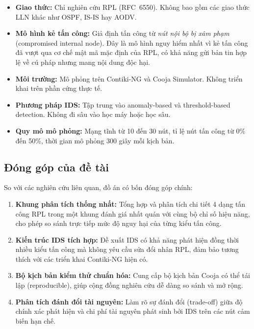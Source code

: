 \begin{itemize}
    \item \textbf{Giao thức:} Chỉ nghiên cứu RPL (RFC~6550). Không bao
          gồm các giao thức LLN khác như OSPF, IS-IS hay AODV.

    \item \textbf{Mô hình kẻ tấn công:} Giả định tấn công từ \textit{nút
          nội bộ bị xâm phạm} (compromised internal node). Đây là mô
          hình nguy hiểm nhất vì kẻ tấn công đã vượt qua cơ chế mật mã
          mặc định của RPL, có khả năng gửi bản tin hợp lệ về cú pháp
          nhưng mang nội dung độc hại.

    \item \textbf{Môi trường:} Mô phỏng trên Contiki-NG và Cooja
          Simulator. Không triển khai trên phần cứng thực tế.

    \item \textbf{Phương pháp IDS:} Tập trung vào anomaly-based và
          threshold-based detection. Không đi sâu vào học máy hoặc
          học sâu.

    \item \textbf{Quy mô mô phỏng:} Mạng tĩnh từ 10 đến 30 nút, tỉ lệ
          nút tấn công từ 0\% đến 50\%, thời gian mô phỏng 300 giây
          mỗi kịch bản.
\end{itemize}

\subsection{Đóng góp của đề tài}
\label{subsec:contribution}

So với các nghiên cứu liên quan, đồ án có bốn đóng góp chính:

\begin{enumerate}
    \item \textbf{Khung phân tích thống nhất:} Tổng hợp và phân tích chi
          tiết 4 dạng tấn công RPL trong một khung đánh giá nhất quán với
          cùng bộ chỉ số hiệu năng, cho phép so sánh trực tiếp mức độ
          nguy hại của từng kiểu tấn công.

    \item \textbf{Kiến trúc IDS tích hợp:} Đề xuất IDS có khả năng phát
          hiện đồng thời nhiều kiểu tấn công mà không yêu cầu sửa đổi
          nhân RPL, đảm bảo tương thích với các triển khai Contiki-NG
          hiện có.

    \item \textbf{Bộ kịch bản kiểm thử chuẩn hóa:} Cung cấp bộ kịch
          bản Cooja có thể tái lập (reproducible), giúp cộng đồng nghiên
          cứu dễ dàng so sánh và mở rộng.

    \item \textbf{Phân tích đánh đổi tài nguyên:} Làm rõ sự đánh đổi
          (trade-off) giữa độ chính xác phát hiện và chi phí tài nguyên
          phát sinh bởi IDS trên các nút cảm biến hạn chế.
\end{enumerate}

